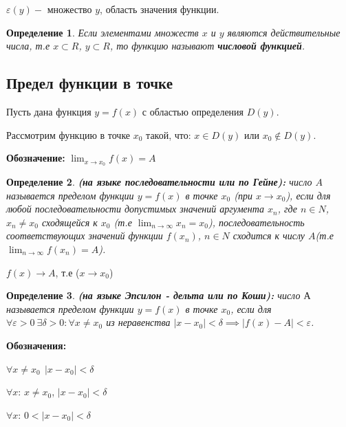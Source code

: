\documentclass[12pt, a4paper]{article}
\newtheorem{definition}{Определение}[subsection]
\theoremstyle{remark}
\newcommand{\Y}{\mathbb{\forall}}
\newcommand{\F}{\mathbb{\exists}}
\newcommand{\E}{\mathbb{\varepsilon}}
\begin{document}
	$\E(y) - $ множество $y$, область значения функции. 
	
	\begin{definition}
		Если элементами множеств $x$ и $y$ являются действительные числа, т.е $x \subset R$, $y \subset R$, то функцию называют \textbf{числовой функцией}.
	\end{definition}
	
	\subsection{Предел функции в точке}
	
	Пусть дана функция $y = f(x)$ с областью определения $D(y)$.
	\vspace{0.4cm}
	
	\noindent Рассмотрим функцию в точке $x_0$ такой, что: $x \in D(y)$ или $x_0 \notin D(y)$.
	\vspace{0.4cm}
	
	\textbf{Обозначение:} $\lim_{x \to x_0} f(x) = A$
	
	\begin{definition}
		\textbf{(на языке последовательности или по Гейне):} число $A$ называется пределом функции $y = f(x)$ в точке $x_0$ (при $x \to x_0$), если для любой последовательности допустимых значений аргумента $x_n$, где $n \in N$, $x_n \neq x_0$ сходящейся к $x_0$ (т.е $\lim_{n \to \infty} x_n = x_0$), последовательность соответствующих значений функции $f(x_n)$, $n \in N$ сходится к числу $A$(т.е $\lim_{n \to \infty} f(x_n) = A$).
	\end{definition}
	
	$f(x) \to A$, т.е ($x \to x_0$)
	
	\begin{definition}
		\textbf{(на языке Эпсилон - дельта или по Коши):} число $А$ называется пределом функции $y = f(x)$ в точке $x_0$, если для $\Y\E > 0 \ \F\delta > 0: \Y x \neq x_0$ из неравенства $|x - x_0| < \delta \implies |f(x) - A| < \E$.
	\end{definition}
	
	\textbf{Обозначения:} 
	
	$\Y x \neq x_0 \ \ |x - x_0| < \delta$
	\vspace{0.2cm}
	
	$\Y x$: $x \neq x_0$, $|x - x_0| < \delta$ 	
	\vspace{0.2cm}
	
	$\Y x$: $0 < |x - x_0| < \delta$
	\vspace{0.4cm}
	
\end{document}
